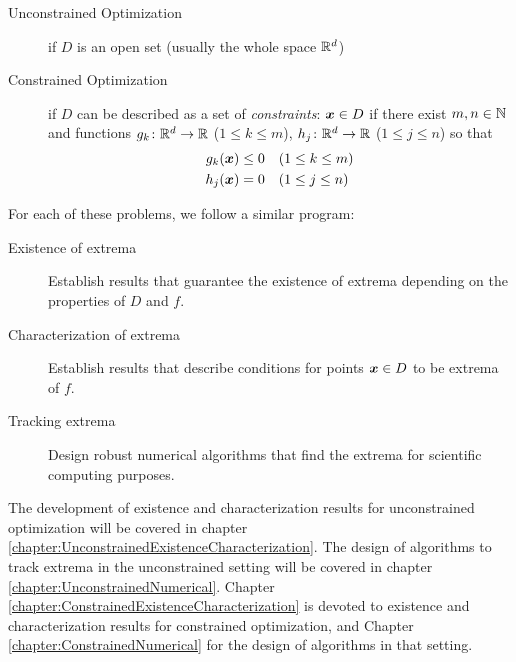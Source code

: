 \begin{description}
	\item [Unconstrained Optimization] if $D$ is an open set (usually the whole space $\mathbb{R}^d$)
	\item [Constrained Optimization] if $D$ can be described as a set of \emph{constraints}: $\boldsymbol{x} \in D$ if there exist $m,n \in \mathbb{N}$ and functions $g_k\colon \mathbb{R}^d \to \mathbb{R}$ ($1\leq k \leq m$), $h_j\colon \mathbb{R}^d \to \mathbb{R}$ ($1\leq j \leq n$) so that
	\begin{align*}
	g_k(\boldsymbol{x}) &\leq  0 \quad (1\leq k \leq m) \\
	h_j(\boldsymbol{x}) &= 0     \quad (1\leq j \leq n)
	\end{align*}
\end{description}
For each of these problems, we follow a similar program:
\begin{description}
	\item[Existence of extrema] Establish results that guarantee the existence of extrema depending on the properties of $D$ and $f$. 
	\item[Characterization of extrema] Establish results that describe conditions for points $\boldsymbol{x} \in D$ to be extrema of $f$.  
	\item[Tracking extrema] Design robust numerical algorithms that find the extrema for scientific computing purposes.
\end{description}
The development of existence and characterization results for unconstrained optimization will be covered in chapter \ref{chapter:UnconstrainedExistenceCharacterization}.  The design of algorithms to track extrema in the unconstrained setting will be covered in chapter \ref{chapter:UnconstrainedNumerical}.  Chapter \ref{chapter:ConstrainedExistenceCharacterization} is devoted to existence and characterization results for constrained optimization, and Chapter \ref{chapter:ConstrainedNumerical} for the design of algorithms in that setting.









